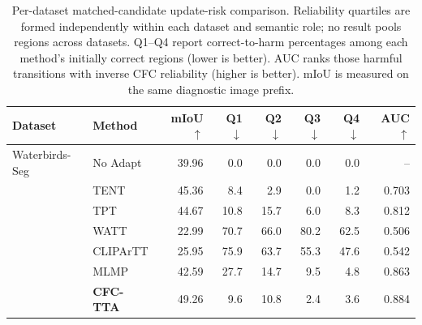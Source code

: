 \begin{table}[t]
\centering
\small
\setlength{\tabcolsep}{4.5pt}
\caption{Per-dataset matched-candidate update-risk comparison. Reliability quartiles are formed independently within each dataset and semantic role; no result pools regions across datasets. Q1--Q4 report correct-to-harm percentages among each method's initially correct regions (lower is better). AUC ranks those harmful transitions with inverse CFC reliability (higher is better). mIoU is measured on the same diagnostic image prefix.}
\label{tab:source-risk-per-dataset}
\begin{tabular}{llrrrrrr}
\toprule
Dataset & Method & mIoU $\uparrow$ & Q1 $\downarrow$ & Q2 $\downarrow$ & Q3 $\downarrow$ & Q4 $\downarrow$ & AUC $\uparrow$ \\
\midrule
Waterbirds-Seg & No Adapt & 39.96 & 0.0 & 0.0 & 0.0 & 0.0 & -- \\
 & TENT & 45.36 & 8.4 & 2.9 & 0.0 & 1.2 & 0.703 \\
 & TPT & 44.67 & 10.8 & 15.7 & 6.0 & 8.3 & 0.812 \\
 & WATT & 22.99 & 70.7 & 66.0 & 80.2 & 62.5 & 0.506 \\
 & CLIPArTT & 25.95 & 75.9 & 63.7 & 55.3 & 47.6 & 0.542 \\
 & MLMP & 42.59 & 27.7 & 14.7 & 9.5 & 4.8 & 0.863 \\
 & \textbf{CFC-TTA} & 49.26 & 9.6 & 10.8 & 2.4 & 3.6 & 0.884 \\
\bottomrule
\end{tabular}
\end{table}
